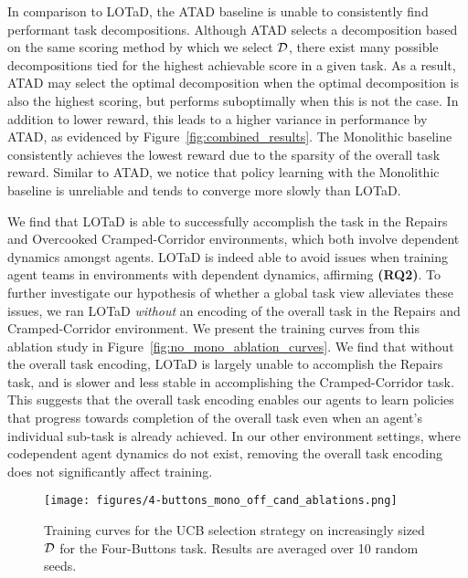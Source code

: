 In comparison to LOTaD, the ATAD baseline is unable to consistently find performant task decompositions. Although ATAD selects a decomposition based on the same scoring method by which we select $\mathcal{D}$, there exist many possible decompositions tied for the highest achievable score in a given task. As a result, ATAD may select the optimal decomposition when the optimal decomposition is also the highest scoring, but performs suboptimally when this is not the case. In addition to lower reward, this leads to a higher variance in performance by ATAD, as evidenced by Figure~\ref{fig:combined_results}. The Monolithic baseline consistently achieves the lowest reward due to the sparsity of the overall task reward. Similar to ATAD, we notice that policy learning with the Monolithic baseline is unreliable and tends to converge more slowly than LOTaD.


We find that LOTaD is able to successfully accomplish the task in the Repairs and Overcooked Cramped-Corridor environments, which both involve dependent dynamics amongst agents. LOTaD is indeed able to avoid issues when training agent teams in environments with dependent dynamics, affirming \textbf{(RQ2)}. To further investigate our hypothesis of whether a global task view alleviates these issues, we ran LOTaD \textit{without} an encoding of the overall task in the Repairs and Cramped-Corridor environment. We present the training curves from this ablation study in Figure~\ref{fig:no_mono_ablation_curves}. We find that without the overall task encoding, LOTaD is largely unable to accomplish the Repairs task, and is slower and less stable in accomplishing the Cramped-Corridor task. This suggests that the overall task encoding enables our agents to learn policies that progress towards completion of the overall task even when an agent's individual sub-task is already achieved. 
In our other environment settings, where codependent agent dynamics do not exist, removing the overall task encoding does not significantly affect training.

\begin{figure}
\centering
\texttt{[image: figures/4-buttons\_mono\_off\_cand\_ablations.png]}
\caption{Training curves for the UCB selection strategy on increasingly sized $\mathcal{D}$ for the Four-Buttons task. Results are averaged over 10 random seeds.}
\label{fig:scaling_results}
\end{figure} 



